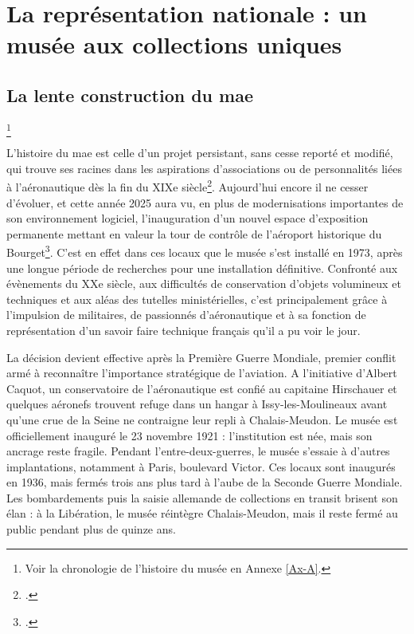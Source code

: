 \section{\label{I-A-1}La représentation nationale : un musée aux collections uniques}

\subsection{La lente construction du \ac{mae}}\footnote{Voir la chronologie de l'histoire du musée en Annexe \ref{Ax-A}.}

L’histoire du \acf{mae} est celle d’un projet persistant, sans cesse reporté et modifié, qui trouve ses racines dans les aspirations d'associations ou de personnalités liées à l'aéronautique dès la fin du XIXe siècle\footcite{terrier_eroport_2019}. Aujourd'hui encore il ne cesser d'évoluer, et cette année 2025 aura vu, en plus de modernisations importantes de son environnement logiciel, l'inauguration d'un nouvel espace d'exposition permanente mettant en valeur la tour de contrôle de l'aéroport historique du Bourget\footcite{museedelairetdelespaceHallNavigationAerienne2025}. C'est en effet dans ces locaux que le musée s'est installé en 1973, après une longue période de recherches pour une installation définitive. Confronté aux évènements du XXe siècle, aux difficultés de conservation d'objets volumineux et techniques et aux aléas des tutelles ministérielles, c'est principalement grâce à l'impulsion de militaires, de passionnés d'aéronautique et à sa fonction de représentation d'un savoir faire technique français qu'il a pu voir le jour.

La décision devient effective après la Première Guerre Mondiale, premier conflit armé à reconnaître l'importance stratégique de l'aviation. A l'initiative d'Albert Caquot, un conservatoire de l'aéronautique est confié au capitaine Hirschauer et quelques aéronefs trouvent refuge dans un hangar à Issy-les-Moulineaux avant qu'une crue de la Seine ne contraigne leur repli à Chalais-Meudon. Le musée est officiellement inauguré le 23 novembre 1921 : l’institution est née, mais son ancrage reste fragile.
Pendant l’entre-deux-guerres, le musée s’essaie à d’autres implantations, notamment à Paris, boulevard Victor. Ces locaux sont inaugurés en 1936, mais fermés trois ans plus tard à l’aube de la Seconde Guerre Mondiale. Les bombardements puis la saisie allemande de collections en transit brisent son élan : à la Libération, le musée réintègre Chalais-Meudon, mais il reste fermé au public pendant plus de quinze ans.

